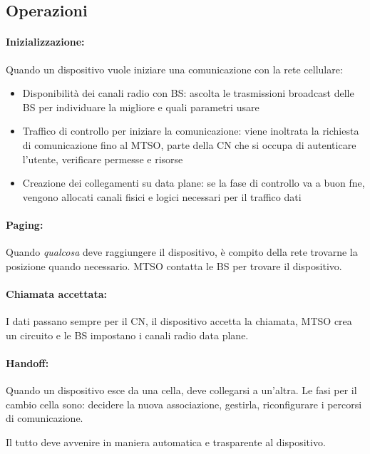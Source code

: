 \subsection{Operazioni}

\paragraph{Inizializzazione:} Quando un dispositivo vuole iniziare una comunicazione con la rete cellulare: 
\begin{itemize}
    \item Disponibilità dei canali radio con BS: ascolta le trasmissioni broadcast delle BS per individuare la migliore e quali parametri usare
    
    \item Traffico di controllo per iniziare la comunicazione: viene inoltrata la richiesta di comunicazione fino al MTSO, parte della CN che si occupa di autenticare l'utente, verificare permesse e risorse
    
    \item Creazione dei collegamenti su data plane: se la fase di controllo va a buon fne, vengono allocati canali fisici e logici necessari per il traffico dati
\end{itemize}

\paragraph{Paging:} Quando \textit{qualcosa} deve raggiungere il dispositivo, è compito della rete trovarne la posizione quando necessario. MTSO contatta le BS per trovare il dispositivo.

\paragraph{Chiamata accettata:} I dati passano sempre per il CN, il dispositivo accetta la chiamata, MTSO crea un circuito e le BS impostano i canali radio data plane. 

\paragraph{Handoff:} Quando un dispositivo esce da una cella, deve collegarsi a un'altra. Le fasi per il cambio cella sono: decidere la nuova associazione, gestirla, riconfigurare i percorsi di comunicazione. 

Il tutto deve avvenire in maniera automatica e trasparente al dispositivo.

